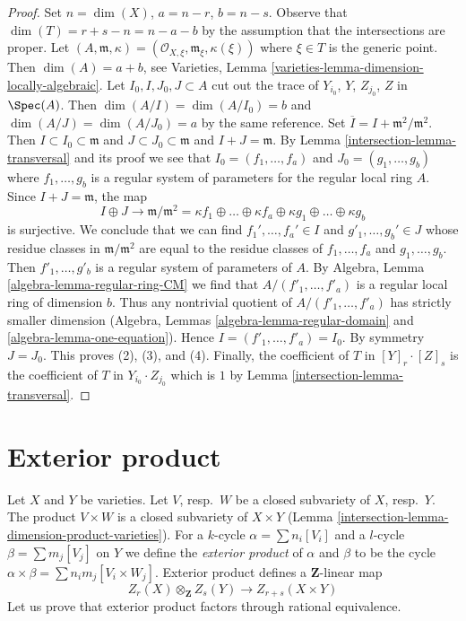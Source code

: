 \begin{proof}

Set $n = \dim(X)$, $a = n - r$, $b = n - s$. Observe that
$\dim(T) = r + s - n = n - a - b$ by the assumption that the
intersections are proper. Let $(A, \mathfrak m, \kappa) =
(\mathcal{O}_{X, \xi}, \mathfrak m_\xi, \kappa(\xi))$ where $\xi \in T$
is the generic point. Then $\dim(A) = a + b$, see
Varieties, Lemma \ref{varieties-lemma-dimension-locally-algebraic}.
Let $I_0, I, J_0, J \subset A$ cut out the trace of
$Y_{i_0}$, $Y$, $Z_{j_0}$, $Z$ in $\Spec(A)$.
Then $\dim(A/I) = \dim(A/I_0) = b$ and $\dim(A/J) = \dim(A/J_0) = a$
by the same reference. Set $\overline{I} = I + \mathfrak m^2/\mathfrak m^2$.
Then $I \subset I_0 \subset \mathfrak m$ and
$J \subset J_0 \subset \mathfrak m$ and $I + J = \mathfrak m$.
By Lemma \ref{intersection-lemma-transversal} and its proof we see that
$I_0 = (f_1, \ldots, f_a)$ and $J_0 = (g_1, \ldots, g_b)$
where $f_1, \ldots, g_b$ is a regular system of parameters
for the regular local ring $A$. Since $I + J = \mathfrak m$, the map
$$
I \oplus J \to
\mathfrak m/\mathfrak m^2 =
\kappa f_1
\oplus \ldots \oplus
\kappa f_a
\oplus
\kappa g_1
\oplus \ldots \oplus
\kappa g_b
$$
is surjective. We conclude that we can find
$f_1', \ldots, f_a' \in I$ and $g'_1, \ldots, g_b' \in J$
whose residue classes in $\mathfrak m/\mathfrak m^2$ are equal to the
residue classes of $f_1, \ldots, f_a$ and $g_1, \ldots, g_b$.
Then $f'_1, \ldots, g'_b$ is a regular system of parameters of $A$.
By Algebra, Lemma \ref{algebra-lemma-regular-ring-CM} we find that
$A/(f'_1, \ldots, f'_a)$ is a regular local ring of dimension $b$.
Thus any nontrivial quotient of $A/(f'_1, \ldots, f'_a)$
has strictly smaller dimension
(Algebra, Lemmas \ref{algebra-lemma-regular-domain} and
\ref{algebra-lemma-one-equation}). Hence $I = (f'_1, \ldots, f'_a) = I_0$.
By symmetry $J = J_0$. This proves (2), (3), and (4).
Finally, the coefficient of $T$ in $[Y]_r \cdot [Z]_s$
is the coefficient of $T$ in $Y_{i_0} \cdot Z_{j_0}$ which is
$1$ by Lemma \ref{intersection-lemma-transversal}.
\end{proof}

\section{Exterior product}
\label{intersection-section-exterior-product}
Let $X$ and $Y$ be varieties.
Let $V$, resp.\ $W$ be a closed subvariety of $X$, resp.\ $Y$.
The product $V\times W$ is a closed subvariety of $X\times Y$
(Lemma \ref{intersection-lemma-dimension-product-varieties}).
For a $k$-cycle $\alpha = \sum n_i [V_i]$ and a $l$-cycle
$\beta = \sum m_j [V_j]$ on $Y$ we define the
{\it exterior product} of $\alpha$ and $\beta$ to be the cycle
$\alpha \times \beta = \sum n_i m_j [V_i \times W_j]$.
Exterior product defines a $\mathbf{Z}$-linear map
$$
Z_r(X) \otimes_\mathbf{Z} Z_s(Y) \longrightarrow Z_{r + s}(X \times Y)
$$
Let us prove that exterior product factors through rational equivalence.

